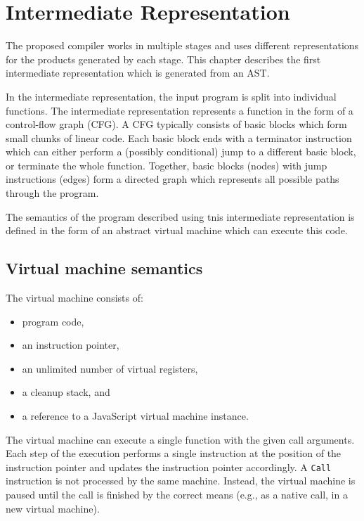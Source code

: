 \chapter{Intermediate Representation}

The proposed compiler works in multiple stages and uses different representations for the products generated by each stage. This chapter describes the first intermediate representation which is generated from an AST.

In the intermediate representation, the input program is split into individual functions. The intermediate representation represents a function in the form of a control-flow graph (CFG). A CFG typically consists of basic blocks which form small chunks of linear code. Each basic block ends with a terminator instruction which can either perform a (possibly conditional) jump to a different basic block, or terminate the whole function. Together, basic blocks (nodes) with jump instructions (edges) form a directed graph which represents all possible paths through the program.

The semantics of the program described using tnis intermediate representation is defined in the form of an abstract virtual machine which can execute this code.

\section{Virtual machine semantics}

The virtual machine consists of:
\begin{itemize}
    \item program code,
    \item an instruction pointer,
    \item an unlimited number of virtual registers,
    \item a cleanup stack, and
    \item a reference to a JavaScript virtual machine instance.
\end{itemize}

The virtual machine can execute a single function with the given call arguments. Each step of the execution performs a single instruction at the position of the instruction pointer and updates the instruction pointer accordingly. A \texttt{Call} instruction is not processed by the same machine. Instead, the virtual machine is paused until the call is finished by the correct means (e.g., as a native call, in a new virtual machine).

